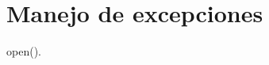 
\section{Manejo de excepciones}

\begin{frame}[c]{}

  \vspace{\baselineskip}
  \textcolor{codeKeyword2}{open}().
\end{frame}

\begin{frame}[fragile]
  \frametitle{}

  \begin{lstlisting}[language=Python]
  \end{lstlisting}
\end{frame}
